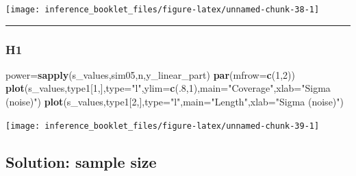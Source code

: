 \documentclass[]{article}
\newenvironment{Shaded}{\begin{snugshade}}{\end{snugshade}}
\newcommand{\KeywordTok}[1]{\textcolor[rgb]{0.13,0.29,0.53}{\textbf{#1}}}
\newcommand{\DataTypeTok}[1]{\textcolor[rgb]{0.13,0.29,0.53}{#1}}
\newcommand{\DecValTok}[1]{\textcolor[rgb]{0.00,0.00,0.81}{#1}}
\newcommand{\StringTok}[1]{\textcolor[rgb]{0.31,0.60,0.02}{#1}}
\newcommand{\NormalTok}[1]{#1}
\begin{document}
\begin{center}\texttt{[image: inference\_booklet\_files/figure-latex/unnamed-chunk-38-1]} \end{center}

\begin{center}\rule{0.5\linewidth}{\linethickness}\end{center}

\subsubsection{H1}\label{h1-1}

\begin{Shaded}
\begin{Highlighting}[]
\NormalTok{power=}\KeywordTok{sapply}\NormalTok{(s_values,sim05,n,y_linear_part)}
\KeywordTok{par}\NormalTok{(}\DataTypeTok{mfrow=}\KeywordTok{c}\NormalTok{(}\DecValTok{1}\NormalTok{,}\DecValTok{2}\NormalTok{))}
\KeywordTok{plot}\NormalTok{(s_values,type1[}\DecValTok{1}\NormalTok{,],}\DataTypeTok{type=}\StringTok{"l"}\NormalTok{,}\DataTypeTok{ylim=}\KeywordTok{c}\NormalTok{(.}\DecValTok{8}\NormalTok{,}\DecValTok{1}\NormalTok{),}\DataTypeTok{main=}\StringTok{"Coverage"}\NormalTok{,}\DataTypeTok{xlab=}\StringTok{"Sigma (noise)"}\NormalTok{)}
\KeywordTok{plot}\NormalTok{(s_values,type1[}\DecValTok{2}\NormalTok{,],}\DataTypeTok{type=}\StringTok{"l"}\NormalTok{,}\DataTypeTok{main=}\StringTok{"Length"}\NormalTok{,}\DataTypeTok{xlab=}\StringTok{"Sigma (noise)"}\NormalTok{)}
\end{Highlighting}
\end{Shaded}

\begin{center}\texttt{[image: inference\_booklet\_files/figure-latex/unnamed-chunk-39-1]} \end{center}

\subsection{Solution: sample size}\label{solution-sample-size}
\end{document}
